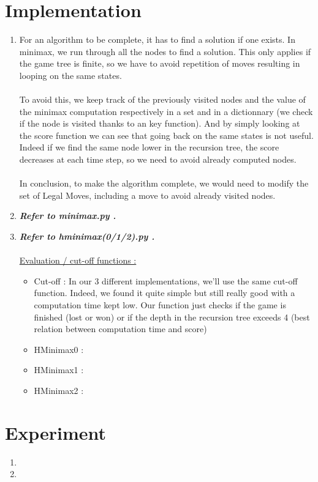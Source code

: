 \documentclass{article}
\begin{document}
\section{Implementation}

\begin{enumerate}[label=\alph*.,leftmargin=*]
    \item For an algorithm to be complete, it has to find a solution if one exists. In minimax, we run through all the nodes to find a solution. This only applies if the game tree is finite, so we have to avoid repetition of moves resulting in looping on the same states.
    \\\\
    To avoid this, we keep track of the previously visited nodes and the value of the minimax computation respectively in a set and in a dictionnary (we check if the node is visited thanks to an key function). And by simply looking at the score function we can see 
    that going back on the same states is not useful. Indeed if we find the same node lower in the recursion tree, the score decreases at each time step, so we need to avoid already computed nodes.
    \\\\
    In conclusion, to make the algorithm complete, we would need to modify the set of Legal Moves, including a move to avoid already visited nodes.
    \item \textbf{\textit{Refer to minimax.py .}}
    \item \textbf{\textit{Refer to hminimax(0/1/2).py .}}
    \\\\\underline{Evaluation / cut-off functions :}
    \begin{itemize}
        \item Cut-off : In our 3 different implementations, we'll use the same cut-off function. Indeed, we found it quite simple but still really good with a computation time kept low. 
        Our function just checks if the game is finished (lost or won) or if the depth in the recursion tree exceeds 4 (best relation between computation time and score)
        \item HMinimax0 : 
        \item HMinimax1 :
        \item HMinimax2 : 
    \end{itemize}
\end{enumerate}

\section{Experiment}

\begin{enumerate}[label=\alph*.,leftmargin=*]
    \item
    \item
\end{enumerate}



\end{document}
